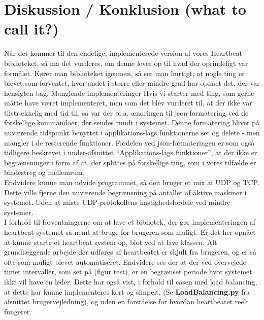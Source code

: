 \documentclass[a4paper,12pt]{article}
\begin{document}
\section{Diskussion / Konklusion (what to call it?)}
Når det kommer til den endelige, implementerede version af vores Heartbeat-biblioteket, så må det vurderes, om denne lever op til hvad der oprindeligt var formålet.
Kører man biblioteket igennem, så ser man hurtigt, at nogle ting er blevet som forventet, hvor andet i større eller mindre grad har opnået det, der var hensigten bag.
Manglende implementeringer 
Hvis vi starter med ting, som gerne måtte have været implementeret, men som det blev vurderet til, at der ikke var tilstrækkelig med tid til, så var der bl.a. ændringen til json-formatering ved de forskellige kommandoer, der sendes rundt i systemet.
Denne formatering bliver på nuværende tidspunkt benyttet i applikations-lags funktionerne set og delete - men mangler i de resterende funktioner.
Fordelen ved json-formateringen er som også tidligere beskrevet i under-afsnittet “Applikations-lags funktioner”, at der ikke er begrænsninger i form af at, der splittes på forskellige ting, som i vores tilfælde er bindestreg og mellemrum.
\\[5px]
Endvidere kunne man udvide programmet, så den bruger et mix af UDP og TCP. Dette ville fjerne den nuværende begrænsning på antallet af aktive maskiner i systemet. Uden at miste UDP-protokollens hastighedsfordele ved mindre systemer.
\\[5px]
I forhold til forventningerne om at lave et bibliotek, der gør implementeringen af heartbeat systemet så nemt at bruge for brugeren som muligt. Er det her opnået at kunne starte et heartbeat system op, blot ved at lave klassen.
Alt grundlæggende arbejde der udføres af heartbeatet er skjult fra brugeren, og er så ofte som muligt blevet automatiseret. 
Endvidere ses der at der ved overvejede timer intervaller, som set på (figur test), er en begrænset periode hvor systemet ikke vil have en leder.
Dette har også vist, i forhold til casen med load balancing, at dette har kunne implementeres kort og simpelt, (Se \textbf{LoadBalancing.py} fra afsnittet brugervejledning), og uden en forståelse for hvordan heartbeatet reelt fungerer.
\end{document}

